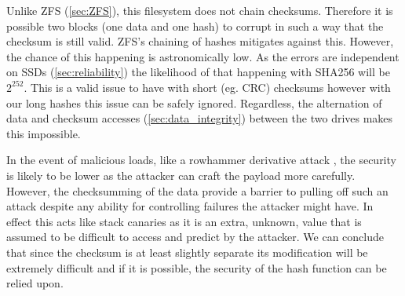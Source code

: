         Unlike ZFS (\autoref{sec:ZFS}), this filesystem does not chain checksums.
        Therefore it is possible two blocks (one data and one hash) to corrupt
        in such a way that the checksum is still valid. ZFS's chaining of
        hashes mitigates against this. However, the chance of this happening is
        astronomically low. As the errors are independent on SSDs
        (\autoref{sec:reliability}) the likelihood of that happening with SHA256
        will be $2^{252}$. This is a valid issue to have with short (eg. CRC)
        checksums however with our long hashes this issue can be safely
        ignored. Regardless, the alternation of data and checksum accesses
        (\autoref{sec:data_integrity}) between the two drives makes this
        impossible.

        In the event of malicious loads, like a rowhammer derivative attack
        \cite{ssd_rowhammer}, the security is likely to be lower as the
        attacker can craft the payload more carefully. However, the
        checksumming of the data provide a barrier to pulling off such an
        attack despite any ability for controlling failures the attacker might
        have. In effect this acts like stack canaries \cite{canary} as it is
        an extra, unknown, value that is assumed to be difficult to access and
        predict by the attacker. We can conclude that since the checksum is at
        least slightly separate its modification will be extremely difficult
        and if it is possible, the security of the hash function can be relied
        upon.

